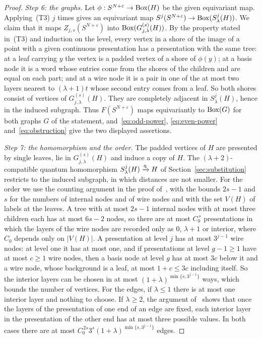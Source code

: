 \begin{proof}
\emph{Step 6: the graphs.} Let $\phi:S^{N+\varepsilon}\to\operatorname{Box}(H)$ be the given equivariant map. Applying~(T3) $j$ times gives an equivariant map $S^j(S^{N+\varepsilon})\to\operatorname{Box}(S^j_\lambda(H))$. We claim that it maps $Z_{j,s}(S^{N+\varepsilon})$ into $\operatorname{Box}(G^{(s)}_{j,\lambda}(H))$. By the property stated in~(T3) and induction on the level, every vertex in a shore of the image of a point with a given continuous presentation has a presentation with the same tree: at a leaf carrying $y$ the vertex is a padded vertex of a shore of $\phi(y)$; at a basis node it is a word whose entries come from the shores of the children and are equal on each part; and at a wire node it is a pair in one of the at most two layers nearest to $(\lambda+1)t$ whose second entry comes from a leaf. So both shores consist of vertices of $G^{(s)}_{j,\lambda}(H)$. They are completely adjacent in $S^j_\lambda(H)$, hence in the induced subgraph. Thus $F(S^{N+\varepsilon})$ maps equivariantly to $\operatorname{Box}(G)$ for both graphs $G$ of the statement, and~\eqref{eq:odd-power}, \eqref{eq:even-power} and~\eqref{eq:obstruction} give the two displayed assertions.

\emph{Step 7: the homomorphism and the order.} The padded vertices of $H$ are presented by single leaves, lie in $G^{(s)}_{j,\lambda}(H)$ and induce a copy of $H$. The $(\lambda+2)$-compatible quantum homomorphism $S^j_\lambda(H)\xrightarrow{\mathrm q} H$ of Section~\ref{sec:substitution} restricts to the induced subgraph, in which distances are not smaller. For the order we use the counting argument in the proof of~\cite[Theorem~3.6]{Z}, with the bounds $2s-1$ and $s$ for the numbers of internal nodes and of wire nodes and with the set $V(H)$ of labels at the leaves. A tree with at most $2s-1$ internal nodes with at most three children each has at most $6s-2$ nodes, so there are at most $C_0^{\,s}$ presentations in which the layers of the wire nodes are recorded only as $0$, $\lambda+1$ or interior, where $C_0$ depends only on $|V(H)|$. A presentation at level $j$ has at most $3^{j-1}$ wire nodes: at level one it has at most one, and if presentations at level $g-1\ge1$ have at most $c\ge1$ wire nodes, then a basis node at level $g$ has at most $3c$ below it and a wire node, whose background is a leaf, at most $1+c\le3c$ including itself. So the interior layers can be chosen in at most $(1+\lambda)^{\min\{s,3^{j-1}\}}$ ways, which bounds the number of vertices. For the edges, if $\lambda\le1$ there is at most one interior layer and nothing to choose. If $\lambda\ge2$, the argument of~\cite{Z} shows that once the layers of the presentation of one end of an edge are fixed, each interior layer in the presentation of the other end has at most three possible values. In both cases there are at most $C_0^{\,2s}3^s(1+\lambda)^{\min\{s,3^{j-1}\}}$ edges.
\end{proof}

